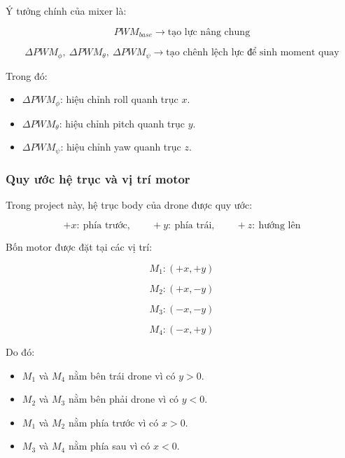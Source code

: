 Ý tưởng chính của mixer là:

\begin{equation}
    PWM_{base}
    \rightarrow
    \text{tạo lực nâng chung}
\end{equation}

\begin{equation}
    \Delta PWM_\phi,\ \Delta PWM_\theta,\ \Delta PWM_\psi
    \rightarrow
    \text{tạo chênh lệch lực để sinh moment quay}
\end{equation}

Trong đó:
\begin{itemize}
    \item $\Delta PWM_\phi$: hiệu chỉnh roll quanh trục $x$.
    \item $\Delta PWM_\theta$: hiệu chỉnh pitch quanh trục $y$.
    \item $\Delta PWM_\psi$: hiệu chỉnh yaw quanh trục $z$.
\end{itemize}

\subsubsection{Quy ước hệ trục và vị trí motor}

Trong project này, hệ trục body của drone được quy ước:

\begin{equation}
    +x:\ \text{phía trước},\qquad
    +y:\ \text{phía trái},\qquad
    +z:\ \text{hướng lên}
\end{equation}

Bốn motor được đặt tại các vị trí:

\begin{equation}
    M_1: (+x,+y)
\end{equation}

\begin{equation}
    M_2: (+x,-y)
\end{equation}

\begin{equation}
    M_3: (-x,-y)
\end{equation}

\begin{equation}
    M_4: (-x,+y)
\end{equation}

Do đó:
\begin{itemize}
    \item $M_1$ và $M_4$ nằm bên trái drone vì có $y>0$.
    \item $M_2$ và $M_3$ nằm bên phải drone vì có $y<0$.
    \item $M_1$ và $M_2$ nằm phía trước vì có $x>0$.
    \item $M_3$ và $M_4$ nằm phía sau vì có $x<0$.
\end{itemize}

